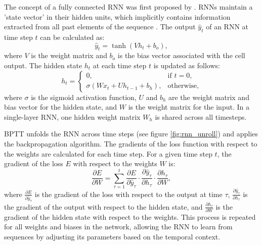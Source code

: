 \documentclass[12pt, a4paper, headinclude, twoside, plainheadsepline, open=right, numbers=noenddot, hidelinks, toc=listof, toc=bibliography]{scrreprt}
\begin{document}
The concept of a fully connected RNN was first proposed by \citeauthor{elmanFindingStructureTime1990} \cite{elmanFindingStructureTime1990}. 
RNNs maintain a 'state vector' in their hidden units, which implicitly contains information extracted from all past elements of the sequence \cite{lecunDeepLearning2015}. The output \( \hat{y}_t \) of an RNN at time step \( t \) can be calculated as:
\begin{equation}
\label{eq:rnn_output}
\hat{y}_t = \tanh(V h_t + b_o),
\end{equation}
where \( V \) is the weight matrix and \( b_o \) is the bias vector associated with the cell output. The hidden state \( h_t \) at each time step \( t \) is updated as follows:
\begin{equation}
\label{eq:rnn_update}
h_t =
\begin{cases}
	0, & \text{if } t = 0, \\
	\sigma (W x_t + U h_{t-1} + b_h), & \text{otherwise},
\end{cases}
\end{equation}
where \( \sigma \) is the sigmoid activation function, \( U \) and \( b_h \) are the weight matrix and bias vector for the hidden state, and \( W \) is the weight matrix for the input. In a single-layer RNN, one hidden weight matrix \( W_h \) is shared across all timesteps.


BPTT unfolds the RNN across time steps (see figure \ref{fig:rnn_unroll}) and applies the backpropagation algorithm. The gradients of the loss function with respect to the weights are calculated for each time step. For a given time step \( t \), the gradient of the loss \( E \) with respect to the weights \( W \) is:
\begin{equation}
\frac{\partial E}{\partial W} = \sum_{\tau=1}^{t} \frac{\partial E}{\partial \hat{y}_\tau} \cdot \frac{\partial \hat{y}_\tau}{\partial h_\tau} \cdot \frac{\partial h_\tau}{\partial W},
\end{equation}
where \( \frac{\partial E}{\partial \hat{y}_\tau} \) is the gradient of the loss with respect to the output at time \( \tau \), \( \frac{\partial \hat{y}_\tau}{\partial h_\tau} \) is the gradient of the output with respect to the hidden state, and \( \frac{\partial h_\tau}{\partial W} \) is the gradient of the hidden state with respect to the weights. This process is repeated for all weights and biases in the network, allowing the RNN to learn from sequences by adjusting its parameters based on the temporal context.
\end{document}
